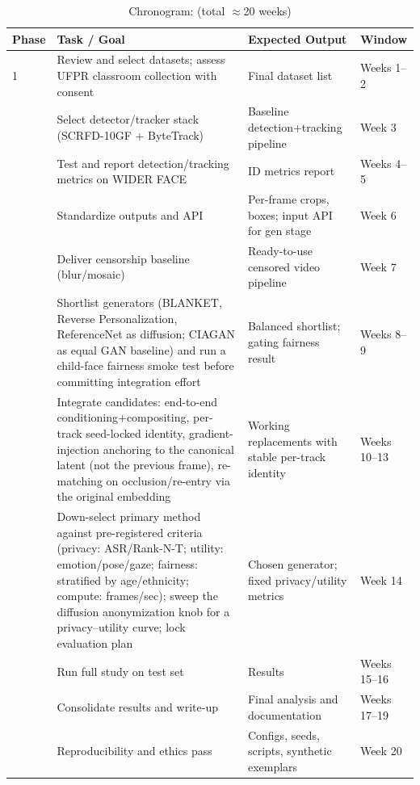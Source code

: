 \documentclass[12pt]{article}
\begin{document}
\begin{table}[ht]
\centering
\caption{Chronogram: (total $\approx$20 weeks)}
\label{tab:chronogram}
\renewcommand{\arraystretch}{1.35} %
\setlength{\tabcolsep}{6pt}        %
\begin{tabular}{p{1.2cm} p{7.6cm} p{4.0cm} p{2.4cm}}
\toprule
\textbf{Phase} & \textbf{Task / Goal} & \textbf{Expected Output} & \textbf{Window} \\
\midrule
1 & Review and select datasets; assess UFPR classroom collection with consent & Final dataset list & Weeks 1--2 \\
\addlinespace
1 & Select detector/tracker stack (SCRFD-10GF + ByteTrack) & Baseline detection+tracking pipeline & Week 3 \\
\addlinespace
1 & Test and report detection/tracking metrics on WIDER FACE & ID metrics report & Weeks 4--5 \\
\addlinespace
1 & Standardize outputs and API & Per-frame crops, boxes; input API for gen stage & Week 6 \\
\addlinespace
1 & Deliver censorship baseline (blur/mosaic) & Ready-to-use censored video pipeline & Week 7 \\
\addlinespace
2 & Shortlist generators (BLANKET, Reverse Personalization, ReferenceNet as diffusion; CIAGAN as equal GAN baseline) and run a child-face fairness smoke test before committing integration effort & Balanced shortlist; gating fairness result & Weeks 8--9 \\
\addlinespace
2 & Integrate candidates: end-to-end conditioning+compositing, per-track seed-locked identity, gradient-injection anchoring to the canonical latent (not the previous frame), re-matching on occlusion/re-entry via the original embedding & Working replacements with stable per-track identity & Weeks 10--13 \\
\addlinespace
2 & Down-select primary method against pre-registered criteria (privacy: ASR/Rank-N-T; utility: emotion/pose/gaze; fairness: stratified by age/ethnicity; compute: frames/sec); sweep the diffusion anonymization knob for a privacy--utility curve; lock evaluation plan & Chosen generator; fixed privacy/utility metrics & Week 14 \\
\addlinespace
2 & Run full study on test set & Results & Weeks 15--16 \\
\addlinespace
2 & Consolidate results and write-up & Final analysis and documentation & Weeks 17--19 \\
\addlinespace
2 & Reproducibility and ethics pass & Configs, seeds, scripts, synthetic exemplars & Week 20 \\
\bottomrule
\end{tabular}
\end{table}
\end{document}
